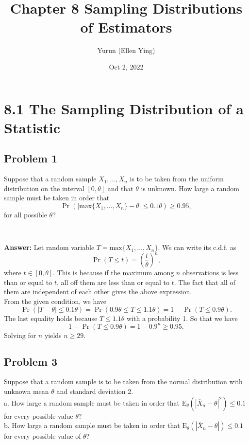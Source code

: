 \documentclass{article}
\title{Chapter 8 Sampling Distributions of Estimators}
\author{Yurun (Ellen Ying)}
\date{Oct 2, 2022}
\begin{document}
\maketitle


\section*{8.1 The Sampling Distribution of a Statistic}

\subsection*{Problem 1}
Suppose that a random sample $X_1, \dots, X_n$ is to be taken from the uniform distribution on the interval $[0, \theta]$ and that $\theta$ is unknown. How large a random sample must be taken in order that
\begin{equation*}
\Pr(|\text{max}\{X_1, \dots, X_n\} - \theta| \le 0.1\theta) \ge 0.95, 
\end{equation*}  
for all possible $\theta$?

\

\textbf{Answer:} Let random variable $T = \text{max}\{X_1, \dots, X_n\}$. We can write its c.d.f. as 
\begin{equation*}
\Pr(T \le t) = (\frac{t}{\theta})^n,
\end{equation*}
where $t \in [0, \theta]$. This is because if the maximum among $n$ observations is less than or equal to $t$, all off them are less than or equal to $t$. The fact that all of them are independent of each other gives the above expression.\\
From the given condition, we have
\begin{equation*}
\Pr(|T - \theta| \le 0.1\theta) = \Pr(0.9\theta \le T \le 1.1\theta) =  1 - \Pr(T \le 0.9 \theta).
\end{equation*}
The last equality holds because $T \le 1.1\theta$ with a probability 1. So that we have
\begin{equation*}
1 - \Pr(T \le 0.9 \theta) = 1 - 0.9^n \ge 0.95.
\end{equation*}
Solving for $n$ yields $n \ge 29$.

\bigskip

\subsection*{Problem 3}
Suppose that a random sample is to be taken from the normal distribution with unknown mean $\theta$ and standard deviation 2. \\
a. How large a random sample must be taken in order that $\text{E}_{\theta}(|\overline{X}_n - \theta|^2) \le 0.1$ for every possible value $\theta$?\\
b. How large a random sample must be taken in order that $\text{E}_{\theta}(|\overline{X}_n - \theta|) \le 0.1$ for every possible value of $\theta$?
\end{document}
